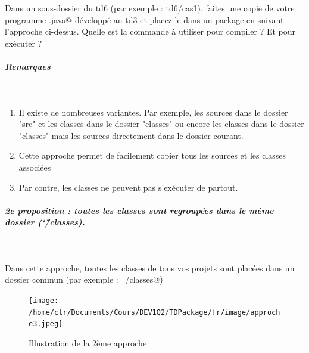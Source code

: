 \documentclass[11pt,a4paper]{article}
\begin{document}
				Dans un sous-dossier du td6
				(par exemple : td6/cas1),
				faites une copie de votre programme 
				\verb@Hello.java@
				d\'evelopp\'e au td3
				et placez-le dans un package en suivant
				l'approche ci-dessus.
				Quelle est la commande \`a utiliser pour compiler ?
				Et pour ex\'ecuter ?
			
            \par
        
			\par\medskip
			
		\subparagraph{Remarques} 
		
					\textcolor{white}{.} \par
				
            \par
        
					\begin{enumerate}
				
			\item 
					Il existe de nombreuses variantes.
					Par exemple, les sources dans le dossier
					"src" et les classes dans le dossier "classes"
					ou encore les classes dans le dossier "classes"
					mais les sources directement dans le dossier
					courant. 
				
			\item 
					Cette approche permet de facilement
					copier tous les sources et les classes associ\'ees
				
			\item 
					Par contre, les classes ne peuvent pas s'ex\'ecuter
					de partout.
			 	
					\end{enumerate}
				
			
		\subparagraph{2e proposition : toutes les classes sont regroup\'ees dans le m\^eme dossier (\char`\~/classes).} 
		
					\textcolor{white}{.} \par
				
            \par
        
				Dans cette approche, toutes les classes
				de tous vos projets sont plac\'ees dans un dossier commun
				(par exemple : \verb@~/classes@)
			
            \par
        \begin{figure}[hbt]
				    \begin{center}
					\texttt{[image: /home/clr/Documents/Cours/DEV1Q2/TDPackage/fr/image/approche3.jpeg]}
						\end{center}
                
                    \caption[Illustration de la 2\`eme approche]{Illustration de la 2\`eme approche}
                \end{figure}
                    
\end{document}

